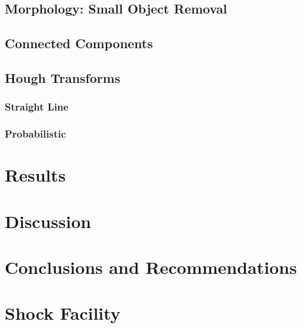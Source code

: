 \subsection{Morphology: Small Object Removal}

\subsection{Connected Components}

\subsection{Hough Transforms}
\subsubsection{Straight Line}
\subsubsection{Probabilistic}


\newpage
\section{Results}

\newpage
\section{Discussion}

\newpage
\section{Conclusions and Recommendations}

\newpage



\normalsize
\newpage

\appendix
{}

\section{Shock Facility} \label{app:facility}

